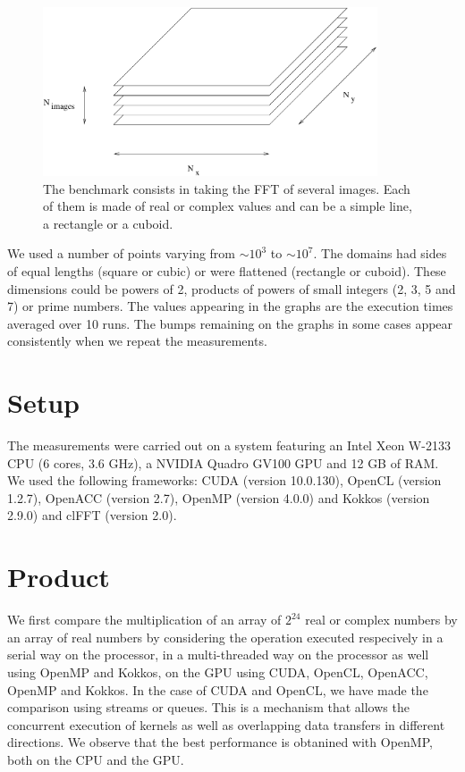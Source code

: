 \documentclass[12pt, a4paper]{article}
\begin{document}
\begin{figure}[H]
\captionsetup{width=0.6\textwidth}
\centering
\includegraphics[height=5cm]{benchmark.pdf}
\caption{The benchmark consists in taking the FFT of several images. Each of them is made of real or complex values and can be a simple line, a rectangle or a cuboid.}
\label{benchmark}
\end{figure}

We used a number of points varying from $\sim 10^3$ to $\sim 10^7$. The domains had sides of equal lengths (square or cubic) or were flattened (rectangle or cuboid). These dimensions could be powers of 2, products of powers of small integers (2, 3, 5 and 7) or prime numbers. The values appearing in the graphs are the execution times averaged over 10 runs. The bumps remaining on the graphs in some cases appear consistently when we repeat the measurements.

\section{Setup}

The measurements were carried out on a system featuring an Intel Xeon W-2133 CPU (6 cores, 3.6 GHz), a NVIDIA Quadro GV100 GPU and 12 GB of RAM. We used the following frameworks: CUDA (version 10.0.130), OpenCL (version 1.2.7), OpenACC (version 2.7), OpenMP (version 4.0.0) and Kokkos (version 2.9.0) and clFFT (version 2.0).  

\section{Product}
We first compare the multiplication of an array of $2^{24}$ real or complex numbers by an array of real numbers by considering the operation executed respecively in a serial way on the processor, in a multi-threaded way on the processor as well using OpenMP and Kokkos, on the GPU using CUDA, OpenCL, OpenACC, OpenMP and Kokkos. In the case of CUDA and OpenCL, we have made the comparison using streams or queues. This is a mechanism that allows the concurrent execution of kernels as well as overlapping data transfers in different directions. We observe that the best performance is obtanined with OpenMP, both on the CPU and the GPU.\\
\end{document}
